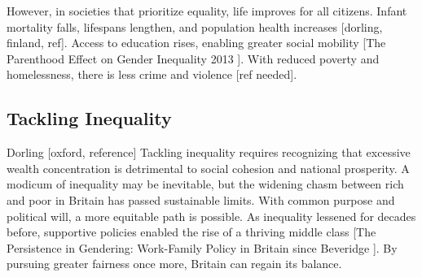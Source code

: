 However, in societies that prioritize equality, life improves for all citizens. Infant mortality falls, lifespans lengthen, and population health increases [dorling, finland, ref]. Access to education rises, enabling greater social mobility [The Parenthood Effect on Gender Inequality 
2013 ]. With reduced poverty and homelessness, there is less crime and violence [ref needed].

\subsection{Tackling Inequality}

Dorling [oxford, reference] Tackling inequality requires recognizing that excessive wealth concentration is detrimental to social cohesion and national prosperity. A modicum of inequality may be inevitable, but the widening chasm between rich and poor in Britain has passed sustainable limits. With common purpose and political will, a more equitable path is possible. As inequality lessened for decades before, supportive policies enabled the rise of a thriving middle class [The Persistence in Gendering: Work-Family Policy in Britain since Beveridge 
]. By pursuing greater fairness once more, Britain can regain its balance.

